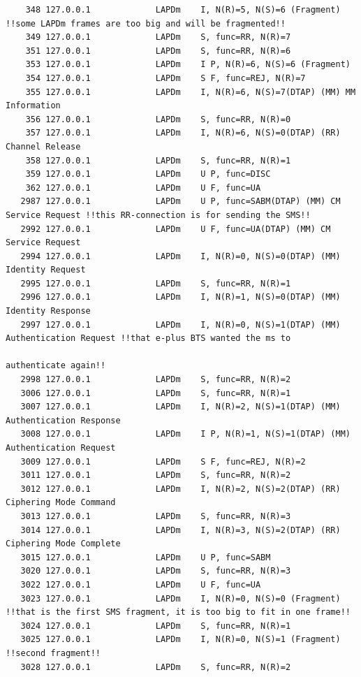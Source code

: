 \begin{lstlisting}
    348 127.0.0.1             LAPDm    I, N(R)=5, N(S)=6 (Fragment) !!some LAPDm frames are too big and will be fragmented!!
    349 127.0.0.1             LAPDm    S, func=RR, N(R)=7
    351 127.0.0.1             LAPDm    S, func=RR, N(R)=6
    353 127.0.0.1             LAPDm    I P, N(R)=6, N(S)=6 (Fragment)
    354 127.0.0.1             LAPDm    S F, func=REJ, N(R)=7
    355 127.0.0.1             LAPDm    I, N(R)=6, N(S)=7(DTAP) (MM) MM Information 
    356 127.0.0.1             LAPDm    S, func=RR, N(R)=0
    357 127.0.0.1             LAPDm    I, N(R)=6, N(S)=0(DTAP) (RR) Channel Release 
    358 127.0.0.1             LAPDm    S, func=RR, N(R)=1
    359 127.0.0.1             LAPDm    U P, func=DISC
    362 127.0.0.1             LAPDm    U F, func=UA
   2987 127.0.0.1             LAPDm    U P, func=SABM(DTAP) (MM) CM Service Request !!this RR-connection is for sending the SMS!!
   2992 127.0.0.1             LAPDm    U F, func=UA(DTAP) (MM) CM Service Request 
   2994 127.0.0.1             LAPDm    I, N(R)=0, N(S)=0(DTAP) (MM) Identity Request 
   2995 127.0.0.1             LAPDm    S, func=RR, N(R)=1
   2996 127.0.0.1             LAPDm    I, N(R)=1, N(S)=0(DTAP) (MM) Identity Response 
   2997 127.0.0.1             LAPDm    I, N(R)=0, N(S)=1(DTAP) (MM) Authentication Request !!that e-plus BTS wanted the ms to
                                                                                           authenticate again!!
   2998 127.0.0.1             LAPDm    S, func=RR, N(R)=2
   3006 127.0.0.1             LAPDm    S, func=RR, N(R)=1
   3007 127.0.0.1             LAPDm    I, N(R)=2, N(S)=1(DTAP) (MM) Authentication Response 
   3008 127.0.0.1             LAPDm    I P, N(R)=1, N(S)=1(DTAP) (MM) Authentication Request 
   3009 127.0.0.1             LAPDm    S F, func=REJ, N(R)=2
   3011 127.0.0.1             LAPDm    S, func=RR, N(R)=2
   3012 127.0.0.1             LAPDm    I, N(R)=2, N(S)=2(DTAP) (RR) Ciphering Mode Command 
   3013 127.0.0.1             LAPDm    S, func=RR, N(R)=3
   3014 127.0.0.1             LAPDm    I, N(R)=3, N(S)=2(DTAP) (RR) Ciphering Mode Complete 
   3015 127.0.0.1             LAPDm    U P, func=SABM
   3020 127.0.0.1             LAPDm    S, func=RR, N(R)=3
   3022 127.0.0.1             LAPDm    U F, func=UA
   3023 127.0.0.1             LAPDm    I, N(R)=0, N(S)=0 (Fragment) !!that is the first SMS fragment, it is too big to fit in one frame!!
   3024 127.0.0.1             LAPDm    S, func=RR, N(R)=1
   3025 127.0.0.1             LAPDm    I, N(R)=0, N(S)=1 (Fragment) !!second fragment!!
   3028 127.0.0.1             LAPDm    S, func=RR, N(R)=2

\end{lstlisting}
